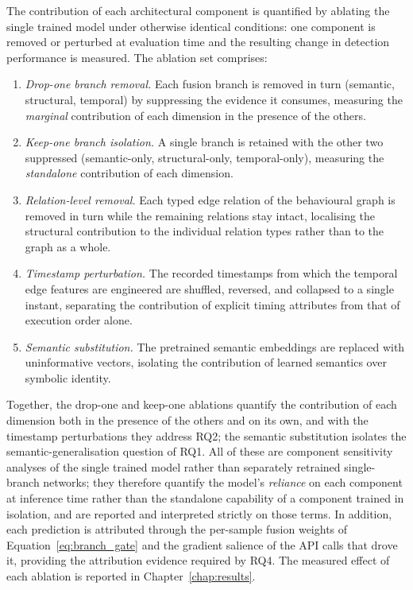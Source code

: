 \documentclass[%
    BCOR=10mm,
    DIV=13,
    toc=bibliography,
    toc=listof,
    oneside,
    12pt,
]{scrbook}
\begin{document}
The contribution of each architectural component is quantified by ablating the
single trained model under otherwise identical conditions: one component is
removed or perturbed at evaluation time and the resulting change in detection
performance is measured. The ablation set comprises:
\begin{enumerate}[leftmargin=*]
  \item \emph{Drop-one branch removal.} Each fusion branch is removed in turn
        (semantic, structural, temporal) by suppressing the evidence it
        consumes, measuring the \emph{marginal} contribution of
        each dimension in the presence of the others.
  \item \emph{Keep-one branch isolation.} A single branch is retained with the
        other two suppressed (se\-mantic-only, struc\-tural-only,
        tem\-poral-only), measuring the \emph{standalone} contribution of each
        dimension.
  \item \emph{Relation-level removal.} Each typed edge relation of the
        behavioural graph is removed in turn while the remaining relations
        stay intact, localising the structural contribution to the
        individual relation types rather than to the graph as a whole.
  \item \emph{Timestamp perturbation.} The recorded timestamps from which the
        temporal edge features are engineered are shuffled, reversed, and
        collapsed to a single instant, separating the contribution of explicit
        timing attributes from that of execution order alone.
  \item \emph{Semantic substitution.} The pretrained semantic embeddings are
        replaced with uninformative vectors, isolating the contribution of
        learned semantics over symbolic identity.
\end{enumerate}
Together, the drop-one and keep-one ablations quantify the contribution of each
dimension both in the presence of the others and on its own, and with the
timestamp perturbations they address RQ2; the semantic substitution
isolates the semantic-generalisation question of RQ1. All of these are
component sensitivity analyses of the single trained model rather than
separately retrained single-branch networks; they therefore quantify the
model's \emph{reliance} on each component at inference time rather than the
standalone capability of a component trained in isolation, and are reported and
interpreted strictly on those terms. In addition, each prediction is
attributed through the per-sample fusion weights of
Equation~\ref{eq:branch_gate} and the gradient salience of the API calls that
drove it, providing the attribution evidence required by RQ4. The measured effect of each ablation is reported in
Chapter~\ref{chap:results}.
\end{document}
